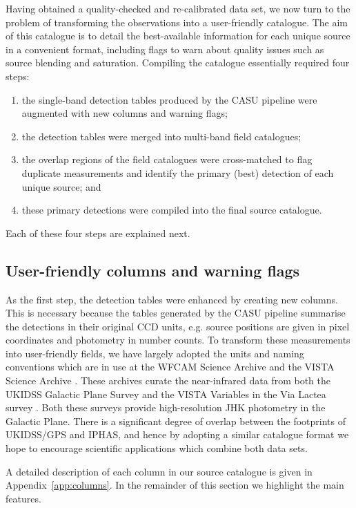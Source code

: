 \documentclass[useAMS,usenatbib]{mn2e}
\begin{document}
Having obtained a quality-checked 
and re-calibrated data set, 
we now turn to the problem
of transforming the observations 
into a user-friendly catalogue.
The aim of this catalogue is to detail
the best-available information for each unique source
in a convenient format,
including flags to warn about quality issues 
such as source blending and saturation.
Compiling the catalogue essentially required four steps:
\begin{enumerate}
\item the single-band detection tables 
produced by the CASU pipeline 
were augmented with new columns
and warning flags;
\item the detection tables were merged into multi-band field catalogues;
\item the overlap regions of the field catalogues 
were cross-matched to flag duplicate measurements 
and identify the primary (best) detection 
of each unique source; and
\item these primary detections
were compiled into the final source catalogue.
\end{enumerate}
Each of these four steps are explained next.

\subsection{User-friendly columns and warning flags}

As the first step, the detection tables 
were enhanced by creating new columns.
This is necessary because the tables 
generated by the CASU pipeline 
summarise the detections 
in their original CCD units,
e.g. source positions are given in pixel coordinates 
and photometry in number counts.
To transform these measurements into
user-friendly fields,
we have largely adopted the units and naming conventions
which are in use at the 
WFCAM Science Archive \citep[WSA;][]{Hambly2008}
and the VISTA Science Archive \citep[VSA;][]{Cross2012}.
These archives curate the near-infrared data from both
the UKIDSS Galactic Plane Survey \citep[GPS;][]{Lucas2008}
and the 
VISTA Variables in the Via Lactea survey \cite[VVV;][]{Minniti2010}.
Both these surveys provide high-resolution JHK photometry
in the Galactic Plane.
There is a significant degree of overlap
between the footprints of UKIDSS/GPS and IPHAS,
and hence by adopting a similar catalogue format
we hope to encourage scientific applications
which combine both data sets.

A detailed description of each column in our source catalogue
is given in Appendix~\ref{app:columns}.
In the remainder of this section we highlight the main features.
\end{document}
